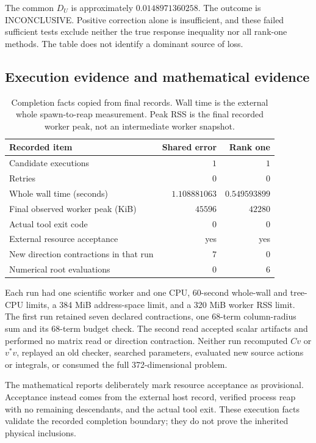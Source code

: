 \documentclass[11pt,a4paper]{article}
\theoremstyle{definition}
\theoremstyle{remark}
\numberwithin{equation}{section}
\begin{document}
The common $D_U$ is approximately $0.0148971360258$.
The outcome is \textsf{INCONCLUSIVE}. Positive correction alone is
insufficient, and these failed sufficient tests exclude neither the
true response inequality nor all rank-one methods.
The table does not identify a dominant source of loss.

\subsection{Execution evidence and mathematical evidence}

\begin{table}[htbp]
\centering
\caption{Completion facts copied from final records. Wall time is the
external whole spawn-to-reap measurement. Peak RSS is the final recorded
worker peak, not an intermediate worker snapshot.}
\label{tab:resources}
\begin{tabular}{lrr}
\toprule
Recorded item & Shared error & Rank one\\
\midrule
Candidate executions & $1$ & $1$\\
Retries & $0$ & $0$\\
Whole wall time (seconds) & $1.108881063$ & $0.549593899$\\
Final observed worker peak (KiB) & $45596$ & $42280$\\
Actual tool exit code & $0$ & $0$\\
External resource acceptance & yes & yes\\
New direction contractions in that run & $7$ & $0$\\
Numerical root evaluations & $0$ & $6$\\
\bottomrule
\end{tabular}
\end{table}

Each run had one scientific worker and one CPU, 60-second whole-wall
and tree-CPU limits, a 384 MiB address-space limit, and a 320 MiB worker
RSS limit. The first run retained seven declared contractions, one
68-term column-radius sum and its 68-term budget check. The second read
accepted scalar artifacts and performed no matrix read or direction
contraction. Neither run recomputed $Cv$ or $v^*v$, replayed an old
checker, searched parameters, evaluated new source actions or integrals,
or consumed the full 372-dimensional problem.

The mathematical reports deliberately mark resource acceptance as
provisional. Acceptance instead comes from the external host record,
verified process reap with no remaining descendants, and the actual
tool exit. These execution facts validate the recorded completion
boundary; they do not prove the inherited physical inclusions.
\end{document}
